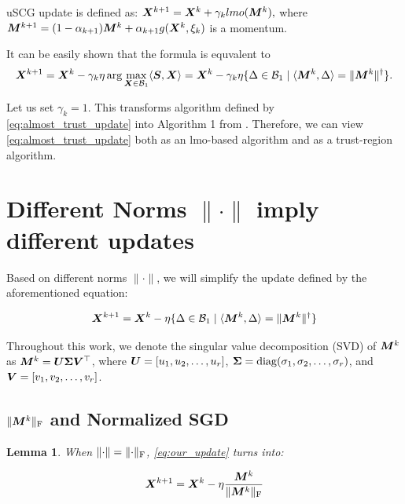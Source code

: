 \documentclass{article} %
\newtheorem{lemma}{Lemma}
\newcommand{\norm}[1]{\lVert #1\rVert}
\newcommand{\cB}{\mathcal{B}}
\DeclarePairedDelimiter{\normf}{\|}{\|_\mathrm{F}}
\def\<#1,#2>{\langle #1,#2\rangle}
\DeclareMathOperator{\diag}{diag}
\begin{document}
    uSCG update is defined as:
    ${\bm{X}}^{k+1} = {\bm{X}}^{k} + \gamma_k lmo({\bm{M}}^k),$ where ${\bm{M}}^{k+1} = (1-\alpha_{k+1}){\bm{M}}^{k} + \alpha_{k+1}g({\bm{X}}^k, \xi_k)$ is a momentum.

    It can be easily shown that the formula is equvalent to
    \begin{equation}\label{eq:almost_trust_update}
        \mX^{k+1} = \mX^{k} - \gamma_k\eta \arg\max_{\mX \in \cB_1} \<\mS, \mX> = \mX^{k} - \gamma_k\eta \{\Delta \in \cB_1 \mid \<\mM^k, \Delta> = \norm{\mM^k}^\dagger\}.
    \end{equation}

    Let us set $\gamma_k = 1$. This transforms algorithm defined by \cref{eq:almost_trust_update} into Algorithm 1 from \citet{kovalev2025understanding}. Therefore, we can view \cref{eq:almost_trust_update} both as an lmo-based algorithm and as a trust-region algorithm.

\section{Different Norms $\norm{\cdot}$ imply different updates}

    Based on different norms $\norm{\cdot}$, we will simplify the update defined by the aforementioned equation:

    \begin{equation}\label{eq:our_update}
        \mX^{k+1} = \mX^{k} - \eta \{\Delta \in \cB_1 \mid \<\mM^k, \Delta> = \norm{\mM^k}^\dagger\}
    \end{equation}

    Throughout this work, we denote the singular value decomposition (SVD) of ${\bm{M}}^k$ as ${\bm{M}}^k = {\bm{U}} {\bm{\Sigma}} {\bm{V}}^\top$, where ${\bm{U}} = [u_1, u_2, \dots, u_r]$, $\mSigma = \diag(\sigma_1, \sigma_2, \dots, \sigma_r)$, and  ${\bm{V}} = [v_1, v_2, \dots, v_r]$.

    \subsection{\texorpdfstring{$\normf{\mM^{k}}$ and Normalized SGD}{NSGD}}

        \begin{lemma}\label{lemma:nsgd_update}
            When $\norm{\cdot} = \normf{\cdot}$, \cref{eq:our_update} turns into:

            \begin{equation}\label{eq:nsgd_update}
                \mX^{k+1} = \mX^{k} - \eta \frac{\mM^k}{\normf{\mM^k}}
            \end{equation}

        \end{lemma}
\end{document}
